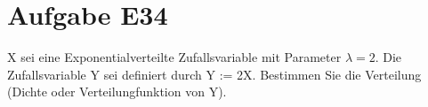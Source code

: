 \section{Aufgabe E34}
X sei eine Exponentialverteilte Zufallsvariable mit Parameter $\lambda=2$. Die Zufallsvariable Y sei definiert durch
Y := 2X. Bestimmen Sie die Verteilung (Dichte oder Verteilungfunktion von Y).